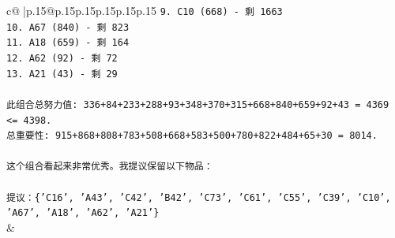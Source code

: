 \documentclass{article}
\begin{document}
{\begin{supertabular}{c@{$\;$}|p{.15\linewidth}@{}p{.15\linewidth}p{.15\linewidth}p{.15\linewidth}p{.15\linewidth}p{.15\linewidth}}
{{{\texttt{9. C10 (668) {-} 剩 1663} \\
\texttt{10. A67 (840) {-} 剩 823} \\
\texttt{11. A18 (659) {-} 剩 164} \\
\texttt{12. A62 (92) {-} 剩 72} \\
\texttt{13. A21 (43) {-} 剩 29} \\
\\ 
\texttt{此组合总努力值: 336+84+233+288+93+348+370+315+668+840+659+92+43 = 4369 <= 4398.} \\
\texttt{总重要性: 915+868+808+783+508+668+583+500+780+822+484+65+30 = 8014.} \\
\\ 
\texttt{这个组合看起来非常优秀。我提议保留以下物品：} \\
\\ 
\texttt{提议：\{'C16', 'A43', 'C42', 'B42', 'C73', 'C61', 'C55', 'C39', 'C10', 'A67', 'A18', 'A62', 'A21'\}} \\
            }
        }
    }
    & \\ \\


\end{supertabular}}
\end{document}
